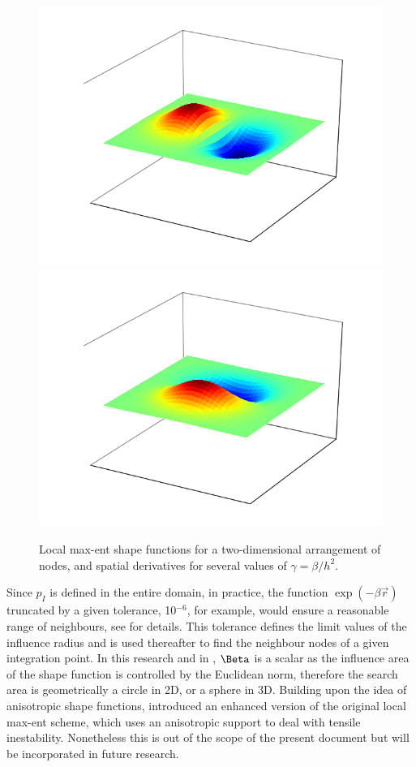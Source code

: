 \begin{figure}
{    \includegraphics[width=0.3\columnwidth]{Figures/LME_5_0_Shape_Fun_dx}
    \includegraphics[width=0.3\columnwidth]{Figures/LME_5_0_Shape_Fun_dy}
    \label{fig:LME_5.0_Shape_Fun}
  }
  \caption{Local max-ent shape functions for a two-dimensional
    arrangement of nodes, and spatial derivatives for several values
    of $\gamma = \beta/h^2$.}
  \label{fig:LME_MPM}
\end{figure}

Since  $p_I$  is defined in the entire domain, in practice, the
function $\exp(-\beta \vec{r} )$ truncated  by  a given tolerance,
10$^{-6}$, for example,  would ensure a reasonable range of
neighbours, see \cite{Arroyo2006} for details. This tolerance defines
the limit values of the influence radius and is used thereafter to
find the neighbour nodes of a given integration point.
In this research and in \cite{Arroyo2006}, $\Beta$ is a scalar as the
influence area of the shape function is controlled by the Euclidean
norm, therefore the search area is geometrically a circle in 2D, or a
sphere in 3D. Building upon the idea of anisotropic shape functions,
\cite{Kochmann2019} introduced an enhanced version of the original
local max-ent scheme, which uses an anisotropic support to deal with
tensile inestability. Nonetheless this is out of the scope of the
present document but will be incorporated in future research.




